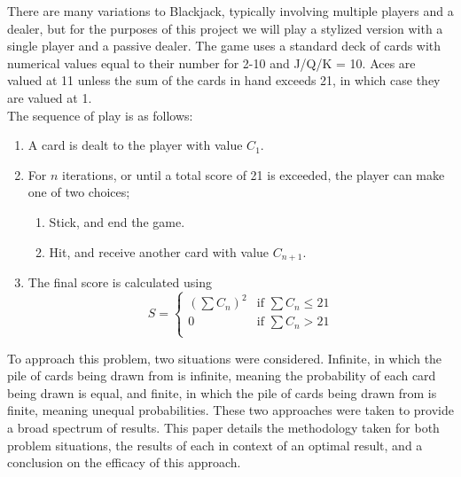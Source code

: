\smallskip
There are many variations to Blackjack, typically involving multiple players and a dealer, but for the purposes of this project we will play a stylized version with a single player and a passive dealer. The game uses a standard deck of cards with numerical values equal to their number for 2-10 and J/Q/K = 10. Aces are valued at 11 unless the sum of the cards in hand exceeds 21, in which case they are valued at 1.\\
The sequence of play is as follows:


\begin{enumerate}
    \item A card is dealt to the player with value \(C_1\).
    \item For \(n\) iterations, or until a total score of 21 is exceeded, the player can make one of two choices;
    \begin{enumerate} 
        \item Stick, and end the game.
        \item Hit, and receive another card with value \(C_{n+1}\).
    \end{enumerate}
    \item The final score is calculated using
        \begin{equation}
            S = 
            \begin{cases}
                (\sum C_n)^2 & \text{if } \sum C_n \le 21\\
                0            & \text{if } \sum C_n >   21\\
            \end{cases}
        \end{equation}
\end{enumerate}

To approach this problem, two situations were considered. Infinite, in which the pile of cards being drawn from is infinite, meaning the probability of each card being drawn is equal, and finite, in which the pile of cards being drawn from is finite, meaning unequal probabilities. These two approaches were taken to provide a broad spectrum of results. This paper details the methodology taken for both problem situations, the results of each in context of an optimal result, and a conclusion on the efficacy of this approach.

